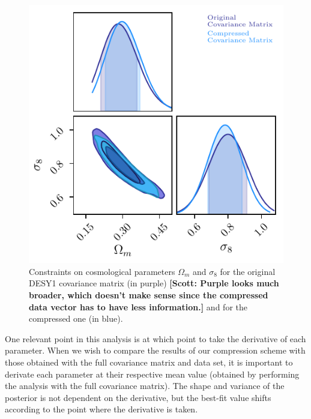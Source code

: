\documentclass[twocolumn]{\docclass}
\newcommand\scott[1]{{\bf [Scott: #1]}}
\begin{document}
	\begin{figure}
		\includegraphics[width=0.9\columnwidth]{Compression/CompressionY1_wm-sigma8.pdf}
		\caption{Constraints on cosmological parameters $\Omega_m$ and $\sigma_8$ for the original DESY1 covariance matrix (in purple) \scott{Purple looks much broader, which doesn't make sense since the compressed data vector has to have less information.} and for the compressed one (in blue). \label{fig:compressiony1}}
	\end{figure}
	
	One relevant point in this analysis is at which point to take the derivative of each parameter. When we wish to compare the results of our compression scheme with those obtained with the full covariance matrix and data set, it is important to derivate each parameter at their respective mean value (obtained by performing the analysis with the full covariance matrix). The shape and variance of the posterior is not dependent on the derivative, but the best-fit value shifts according to the point where the derivative is taken.
	
\end{document}
